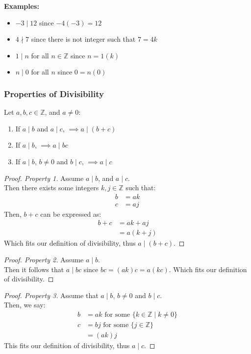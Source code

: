 \documentclass[12pt]{article}
\newcommand{\Z}{\mathbb{Z}}
\theoremstyle{definition}
\begin{document}
    \textbf{Examples:}
    \begin{itemize}
        \item $-3 \mid 12$ since $-4(-3) = 12$
        \item $4 \nmid 7$ since there is not integer such that $7 = 4k$
        \item $1 \mid n$ for all $n \in \Z$ since $n = 1(k)$
        \item $n \mid 0$ for all $n$ since $0 = n(0)$
    \end{itemize}

    \subsubsection{Properties of Divisibility}
    Let $a,b,c \in \Z$, and $a \ne 0$:
    \begin{enumerate}
        \item If $a \mid b$ and $a \mid c$, $\implies a \mid (b+c)$
        \item If $a \mid b$, $\implies a \mid bc$
        \item If $a \mid b$, $b \ne 0$ and $b \mid c$, $\implies a \mid c$
    \end{enumerate}
    \begin{proof}[Proof. Property 1]
        Assume $a \mid b$, and $a \mid c$. \\
        Then there exists some integers $k,j \in \Z$ such that:
        \begin{align*}
            b &= ak \\
            c &= aj
        \end{align*}
        Then, $b+c$ can be expressed as:
        \begin{align*}
            b + c &= ak + aj \\
            &= a(k+j)
        \end{align*}
        Which fits our definition of divisibility, thus $a \mid (b+c)$.
    \end{proof}

    \begin{proof}[Proof. Property 2]
        Assume $a \mid b$. \\
        Then it follows that $a \mid bc$ since $bc = (ak)c = a(kc)$. Which fits our definition
        of divisibility.
    \end{proof}

    \begin{proof}[Proof. Property 3]
        Assume that $a \mid b$, $b \ne 0$ and $b \mid c$. \\
        Then, we say:
        \begin{align*}
            b &= ak \text{ for some } \{k \in \Z \mid k \ne 0\} \\
            c &= bj \text{ for some } \{j \in \Z\} \\
            &= (ak)j
        \end{align*}
        This fits our definition of divisibility, thus $a \mid c$.
    \end{proof}
\end{document}
